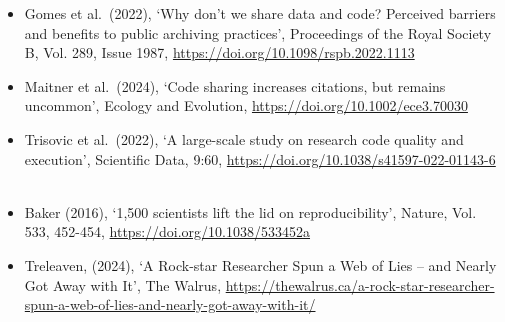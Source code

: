 \documentclass[
]{article}
\begin{document}
\begin{itemize}
\item
  Gomes et al.~(2022), `Why don't we share data and code? Perceived
  barriers and benefits to public archiving practices', Proceedings of
  the Royal Society B, Vol. 289, Issue 1987,
  \hyperref[0]{https://doi.org/10.1098/rspb.2022.1113}
\item
  Maitner et al.~(2024), `Code sharing increases citations, but remains
  uncommon', Ecology and Evolution,
  \url{https://doi.org/10.1002/ece3.70030}
\item
  Trisovic et al.~(2022), `A large-scale study on research code quality
  and execution', Scientific Data, 9:60,
  \url{https://doi.org/10.1038/s41597-022-01143-6} ~
\item
  Baker (2016), `1,500 scientists lift the lid on reproducibility',
  Nature, Vol. 533, 452-454, \url{https://doi.org/10.1038/533452a}
\item
  Treleaven, (2024), `A Rock-star Researcher Spun a Web of Lies -- and
  Nearly Got Away with It', The Walrus,
  \url{https://thewalrus.ca/a-rock-star-researcher-spun-a-web-of-lies-and-nearly-got-away-with-it/}
\end{itemize}
\end{document}
